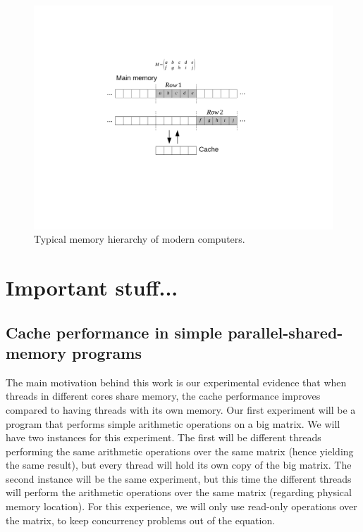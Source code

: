 \documentclass[12pt]{diicc}
\begin{document}
\begin{center}
\begin{figure}[h!]
	\centering
		\includegraphics[width=1.5\textwidth]{matrixmemory}
	\caption{Typical memory hierarchy of modern computers.}
	\label{fig:cache}
\end{figure}
\end{center}


%  
\chapter{Important stuff...}\label{chap:contributions}

\section{Cache performance in simple parallel-shared-memory programs}
The main motivation behind this work is our experimental evidence that when threads in different cores share memory, the cache performance improves compared to having threads with its own memory. Our first experiment will be a program that performs simple arithmetic operations on a big matrix. We will have two instances for this experiment. The first will be different threads performing the same arithmetic operations over the same matrix (hence yielding the same result), but every thread will hold its own copy of the big matrix. The second instance will be the same experiment, but this time the different threads will perform the arithmetic operations over the same matrix (regarding physical memory location). For this experience, we will only use read-only operations over the matrix, to keep concurrency problems out of the equation.
\end{document}
